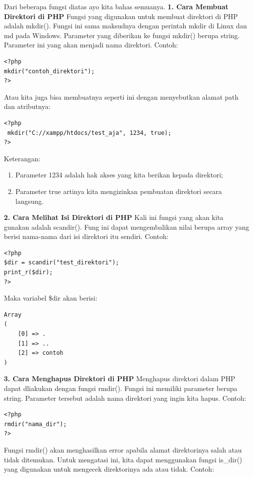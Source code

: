 Dari beberapa fungsi diatas ayo kita bahas semuanya.
\newline
\textbf{1. Cara Membuat Direktori di PHP}
\newline
Fungsi yang digunakan untuk membuat direktori di PHP adalah mkdir(). Fungsi ini sama maksudnya dengan perintah mkdir di Linux dan md pada Windows. Parameter yang diberikan ke fungsi mkdir() berupa string. Parameter ini yang akan menjadi nama direktori. Contoh:
\begin{lstlisting}
<?php 
mkdir("contoh_direktori"); 
?>
\end{lstlisting}

Atau kita juga bisa membuatnya seperti ini dengan menyebutkan alamat path dan atributnya:

\begin{lstlisting}
<?php
 mkdir("C://xampp/htdocs/test_aja", 1234, true); 
?>
\end{lstlisting}

Keterangan:
\begin{enumerate}
\item Parameter 1234 adalah hak akses yang kita berikan kepada direktori;
\item Parameter true artinya kita mengizinkan pembuatan direktori secara langsung.
\end{enumerate}

\textbf{2. Cara Melihat Isi Direktori di PHP}
\newline
Kali ini fungsi yang akan kita gunakan adalah scandir(). Fung ini dapat mengembalikan nilai berupa array yang berisi nama-nama dari isi direktori itu sendiri. Contoh:
\begin{lstlisting}
<?php
$dir = scandir("test_direktori");
print_r($dir);
?>
\end{lstlisting}
Maka variabel \$dir akan berisi:
\begin{lstlisting}
Array
(
    [0] => .
    [1] => ..
    [2] => contoh
)
\end{lstlisting}

\textbf{3. Cara Menghapus Direktori di PHP}
\newline
Menghapus direktori dalam PHP dapat dliakukan dengan fungsi rmdir(). Fungsi ini memiliki parameter berupa string. Parameter tersebut adalah nama direktori yang ingin kita hapus. Contoh:
\begin{lstlisting}
<?php 
rmdir("nama_dir"); 
?>
\end{lstlisting}

Fungsi rmdir() akan menghasilkan error apabila alamat direktorinya salah atau tidak ditemukan. Untuk mengatasi ini, kita dapat menggunakan fungsi is_dir() yang digunakan untuk mengecek direktorinya ada atau tidak. Contoh:

